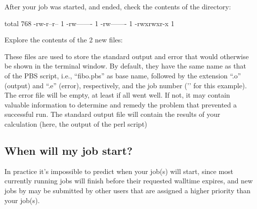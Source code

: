 After your job was started, and ended, check the contents of the directory:

\begin{prompt}
total 768
-rw-r--r-- 1 %
-rw------- 1 %
-rw------- 1 %
-rwxrwxr-x 1 %
\end{prompt}

Explore the contents of the 2 new files:

\begin{prompt}
\end{prompt}

These files are used to store the standard output and error that would
otherwise be shown in the terminal window. By default, they have the same name
as that of the PBS script, i.e., ``fibo.pbs'' as base name, followed by the
extension ``.o'' (output) and ``.e'' (error), respectively, and the job number
('\jobnumber' for this example). The error file will be empty, at least if all went
well. If not, it may contain valuable information to determine and remedy the
problem that prevented a successful run. The standard output file will contain
the results of your calculation (here, the output of the perl script)

\ifgent
\subsection{When will my job start?}
\label{subsec:priority}
In practice it's impossible to predict when your job(s) will start,
since most currently running jobs will finish before their requested walltime
expires, and new jobs by may be submitted by other users that are assigned a higher
priority than your job(s).

